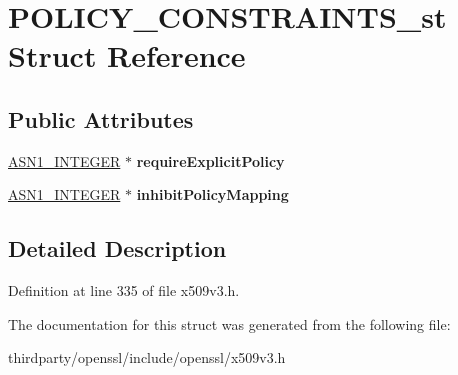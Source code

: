 \hypertarget{struct_p_o_l_i_c_y___c_o_n_s_t_r_a_i_n_t_s__st}{}\section{P\+O\+L\+I\+C\+Y\+\_\+\+C\+O\+N\+S\+T\+R\+A\+I\+N\+T\+S\+\_\+st Struct Reference}
\label{struct_p_o_l_i_c_y___c_o_n_s_t_r_a_i_n_t_s__st}
\subsection*{Public Attributes}
\begin{DoxyCompactItemize}
\item 
\mbox{\label{struct_p_o_l_i_c_y___c_o_n_s_t_r_a_i_n_t_s__st_ac20a75b7ea96a9f0c0449966cdbe77b8}} 
\hyperlink{structasn1__string__st}{A\+S\+N1\+\_\+\+I\+N\+T\+E\+G\+ER} $\ast$ {\bfseries require\+Explicit\+Policy}
\item 
\mbox{\label{struct_p_o_l_i_c_y___c_o_n_s_t_r_a_i_n_t_s__st_a1621bfef679b688916f7ec401d071c01}} 
\hyperlink{structasn1__string__st}{A\+S\+N1\+\_\+\+I\+N\+T\+E\+G\+ER} $\ast$ {\bfseries inhibit\+Policy\+Mapping}
\end{DoxyCompactItemize}


\subsection{Detailed Description}


Definition at line 335 of file x509v3.\+h.



The documentation for this struct was generated from the following file\+:\begin{DoxyCompactItemize}
\item 
thirdparty/openssl/include/openssl/x509v3.\+h\end{DoxyCompactItemize}
